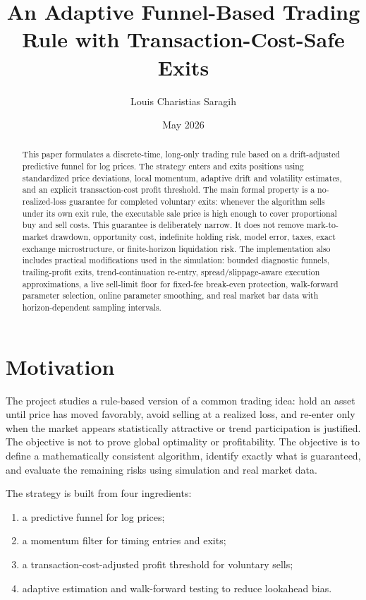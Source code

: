 \documentclass[11pt]{article}
\title{An Adaptive Funnel-Based Trading Rule with Transaction-Cost-Safe Exits}
\author{Louis Charistias Saragih}
\date{May 2026}
\begin{document}
\maketitle

\begin{abstract}
This paper formulates a discrete-time, long-only trading rule based on a drift-adjusted predictive funnel for log prices. The strategy enters and exits positions using standardized price deviations, local momentum, adaptive drift and volatility estimates, and an explicit transaction-cost profit threshold. The main formal property is a no-realized-loss guarantee for completed voluntary exits: whenever the algorithm sells under its own exit rule, the executable sale price is high enough to cover proportional buy and sell costs. This guarantee is deliberately narrow. It does not remove mark-to-market drawdown, opportunity cost, indefinite holding risk, model error, taxes, exact exchange microstructure, or finite-horizon liquidation risk. The implementation also includes practical modifications used in the simulation: bounded diagnostic funnels, trailing-profit exits, trend-continuation re-entry, spread/slippage-aware execution approximations, a live sell-limit floor for fixed-fee break-even protection, walk-forward parameter selection, online parameter smoothing, and real market bar data with horizon-dependent sampling intervals.
\end{abstract}

\section{Motivation}

The project studies a rule-based version of a common trading idea: hold an asset until price has moved favorably, avoid selling at a realized loss, and re-enter only when the market appears statistically attractive or trend participation is justified. The objective is not to prove global optimality or profitability. The objective is to define a mathematically consistent algorithm, identify exactly what is guaranteed, and evaluate the remaining risks using simulation and real market data.

The strategy is built from four ingredients:
\begin{enumerate}
    \item a predictive funnel for log prices;
    \item a momentum filter for timing entries and exits;
    \item a transaction-cost-adjusted profit threshold for voluntary sells;
    \item adaptive estimation and walk-forward testing to reduce lookahead bias.
\end{enumerate}
\end{document}
